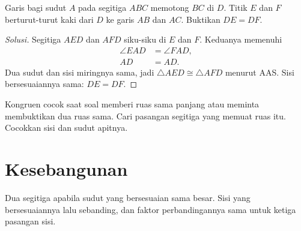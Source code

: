 \documentclass[12pt]{scrartcl}
\begin{document}
\begin{example}
Garis bagi sudut $A$ pada segitiga $ABC$ memotong $BC$ di $D$. Titik $E$
dan $F$ berturut-turut kaki dari $D$ ke garis $AB$ dan $AC$. Buktikan
$DE = DF$.
\begin{center}
\end{center}
\end{example}
\begin{proof}[Solusi]
Segitiga $AED$ dan $AFD$ siku-siku di $E$ dan $F$. Keduanya memenuhi
\begin{align*}
\angle EAD &= \angle FAD, \\
AD &= AD.
\end{align*}
Dua sudut dan sisi miringnya sama, jadi $\triangle AED \cong \triangle
AFD$ menurut AAS. Sisi bersesuaiannya sama: $DE = DF$.
\end{proof}

\begin{remark}
Kongruen cocok saat soal memberi ruas sama panjang atau meminta membuktikan
dua ruas sama. Cari pasangan segitiga yang memuat ruas itu. Cocokkan sisi
dan sudut apitnya.
\end{remark}

\section{Kesebangunan}

Dua segitiga  apabila sudut yang bersesuaian
sama besar. Sisi yang bersesuaiannya lalu sebanding, dan faktor
perbandingannya sama untuk ketiga pasangan sisi.
\end{document}
